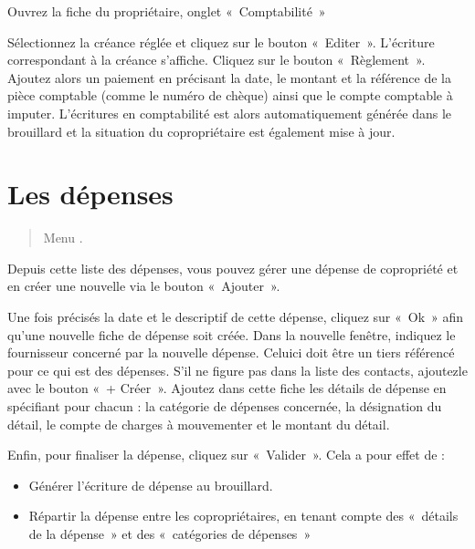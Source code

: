 \documentclass[a4paper,10pt,oneside,french]{sphinxmanual}
\begin{document}
Ouvrez la fiche du propriétaire, onglet « Comptabilité »
\begin{quote}

\noindent{}
\end{quote}

Sélectionnez la créance réglée et cliquez sur le bouton « Editer ». L’écriture correspondant à la créance s’affiche.
Cliquez sur le bouton « Règlement ».
Ajoutez alors un paiement en précisant la date, le montant et la référence de la pièce comptable (comme le numéro de chèque) ainsi que le compte comptable à imputer.
L’écritures en comptabilité est alors automatiquement générée dans le brouillard et la situation du copropriétaire est également mise à jour.


\section{Les dépenses}
\label{\detokenize{condominium/expense:les-depenses}}\label{\detokenize{condominium/expense::doc}}\begin{quote}

Menu .
\end{quote}

Depuis cette liste des dépenses, vous pouvez gérer une dépense de copropriété et en créer une nouvelle via le bouton « Ajouter ».

Une fois précisés la date et le descriptif de cette dépense, cliquez sur « Ok » afin qu’une nouvelle fiche de dépense soit créée.
Dans la nouvelle fenêtre, indiquez le fournisseur concerné par la nouvelle dépense. Celui\sphinxhyphen{}ci doit être un tiers référencé pour ce qui est des dépenses. S’il ne figure pas dans la liste des contacts, ajoutez\sphinxhyphen{}le avec le bouton « + Créer ».
Ajoutez dans cette fiche les détails de dépense en spécifiant pour chacun : la catégorie de dépenses concernée, la désignation du détail, le compte de charges à mouvementer et le montant du détail.
\begin{quote}

\noindent{}
\end{quote}

Enfin, pour finaliser la dépense, cliquez sur « Valider ».
Cela a pour effet de :
\begin{itemize}
\item {} 
Générer l’écriture de dépense au brouillard.

\item {} 
Répartir la dépense entre les copropriétaires, en tenant compte des « détails de la dépense » et des « catégories de dépenses »

\end{itemize}
\end{document}
